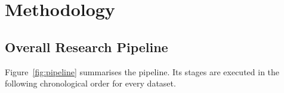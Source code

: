 \documentclass[preprint,12pt]{elsarticle}
\begin{document}

\section{Methodology}
\label{sec:methodology}

\subsection{Overall Research Pipeline}
\label{subsec:pipeline}

Figure~\ref{fig:pipeline} summarises the pipeline. Its stages are executed in the following chronological order for every dataset.
\end{document}
